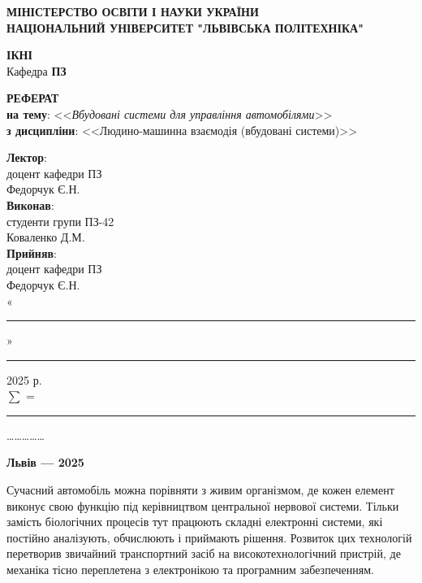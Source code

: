 \documentclass[14pt]{extreport}
\newcommand\subject{Людино-машинна взаємодія (вбудовані системи)}
\newcommand\lecturer{доцент кафедри ПЗ\\Федорчук Є.Н.}
\newcommand\teacher{доцент кафедри ПЗ\\Федорчук Є.Н.}
\newcommand\mygroup{ПЗ-42}
\newcommand\theme{Вбудовані системи для управління автомобілями}
\begin{document}
	\begin{titlepage}
		\thispagestyle{empty}
		\begin{center}
			\textbf{МІНІСТЕРСТВО ОСВІТИ І НАУКИ УКРАЇНИ\\
				НАЦІОНАЛЬНИЙ УНІВЕРСИТЕТ "ЛЬВІВСЬКА ПОЛІТЕХНІКА"}
		\end{center}
		\begin{flushright}
			\textbf{ІКНІ}\\
			Кафедра \textbf{ПЗ}
		\end{flushright}
		\vspace{20pt}
		\begin{center}
			\textbf{РЕФЕРАТ}\\
			\vspace{10pt}
			\textbf{на тему}: <<\textit{\theme}>>\\
			\textbf{з дисципліни}: <<\subject>>
		\end{center}
		\vspace{20pt}
		\begin{flushright}
			
			\textbf{Лектор}:\\
			\lecturer\\
			\vspace{28pt}
			\textbf{Виконав}:\\
			
			студенти групи \mygroup\\
			Коваленко Д.М.\\
			\vspace{28pt}
			\textbf{Прийняв}:\\
			
			\teacher\\
			
			\vspace{28pt}
			«\rule{1cm}{0.15mm}» \rule{1.5cm}{0.15mm} 2025 р.\\
			$\sum$ = \rule{1cm}{0.15mm}……………\\
			
		\end{flushright}
		\vspace{\fill}
		\begin{center}
			\textbf{Львів — 2025}
		\end{center}
	\end{titlepage}  
	
	Сучасний автомобіль можна порівняти з живим організмом, де кожен елемент виконує свою функцію під керівництвом центральної нервової системи. Тільки замість біологічних процесів тут працюють складні електронні системи, які постійно аналізують, обчислюють і приймають рішення. Розвиток цих технологій перетворив звичайний транспортний засіб на високотехнологічний пристрій, де механіка тісно переплетена з електронікою та програмним забезпеченням.
\end{document}
